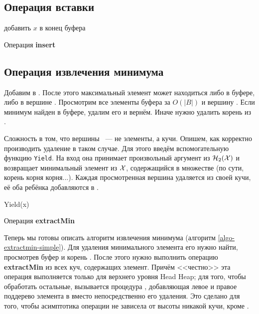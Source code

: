 \subsection{Операция вставки} \label{insert}
\begin{algorithm}[h]
 добавить $x$ в конец буфера\;
 \caption{Операция \textbf{insert}}
 \label{algo-findmin}
\end{algorithm}

\subsection{Операция извлечения минимума} \label{findmin}
Добавим \MH в \HH. После этого максимальный элемент может находиться
либо в буфере, либо в вершине \HH. Просмотрим все элементы буфера
за $O(|B|)$ и вершину \HH. Если минимум найден в буфере, удалим его
и вернём. Иначе нужно удалить корень из \HH. 

Сложность в том, что вершины \HH~--- не элементы, а кучи. Опишем,
как корректно производить удаление в таком случае. Для этого введём
вспомогательную функцию \texttt{Yield}. На вход она принимает
произвольный аргумент из $\mathcal{H}_2(\mathcal{X})$ и возвращает минимальный
элемент из $\mathcal{X}$, содержащийся в множестве (по сути, корень корня корня...).
Каждая просмотренная вершина удаляется из своей кучи, её оба ребёнка
добавляются в \HH.

\begin{function}[h]
 \caption{Yield(x)}
\end{function}

\begin{algorithm}[h]
 \caption{Операция \textbf{extractMin}}
 \label{algo-extractmin-simple}
\end{algorithm}

Теперь мы готовы описать алгоритм извлечения минимума (алгоритм \ref{algo-extractmin-simple}).
Для удаления минимального элемента его нужно найти, просмотрев буфер и корень \HH.
После этого нужно выполнить операцию \textbf{extractMin} из всех куч, содержащих элемент.
Причём <<честно>> эта операция выполняется только для верхнего уровня Head Heap; для
того, чтобы обработать остальные, вызывается процедура \Yield, добавляющая левое
и правое поддерево элемента в \HH вместо непосредственно его удаления. Это сделано
для того, чтобы асимптотика операции не зависела от высоты никакой кучи, кроме \HH.


